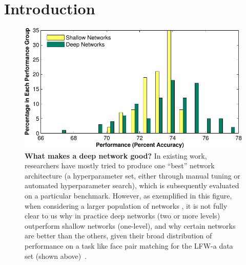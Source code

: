 \documentclass[10pt,twocolumn,letterpaper]{article}
\begin{document}
\section{Introduction}

\begin{figure}
\begin{center}
\includegraphics[width=0.90\columnwidth]{Figs/e_fig7s_compact-crop.pdf} 
\end{center}
\caption{{\bf What makes a deep network good?}
In existing work, researchers have mostly tried to produce one ``best'' network architecture (\ie a hyperparameter set, either through manual tuning or automated hyperparameter search), which is subsequently evaluated on a particular benchmark. However, as exemplified in this figure, when considering a larger population of networks \cite{cox2011beyond}, it is not fully clear to us why in practice deep networks (\eg two or more levels) outperform shallow networks (\eg one-level), and why certain networks are better than the others, given their broad distribution of performance on a task like face pair matching for the LFW-a data set (shown above)~\cite{LFWTech, wolf2011effective}.
} %
\label{fig:perf}
\end{figure}
\end{document}
